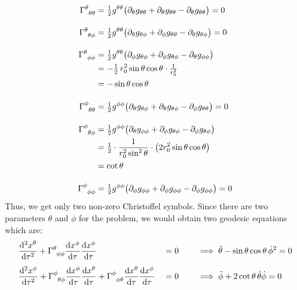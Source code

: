 \begin{align*}
\chris{\theta}{\theta}{\theta} 
&= \tfrac{1}{2} g^{\theta\theta} \big( 
    \partial_\theta g_{\theta\theta} 
  + \partial_\theta g_{\theta\theta} 
  - \partial_\theta g_{\theta\theta} 
\big) = 0 \\[1em]
\chris{\theta}{\theta}{\phi} 
&= \tfrac{1}{2} g^{\theta\theta} \big( 
    \partial_\theta g_{\theta\phi} 
  + \partial_\phi g_{\theta\theta} 
  - \partial_\theta g_{\theta\phi} 
\big) = 0 \\[1em]
\chris{\theta}{\phi}{\phi} 
&= \tfrac{1}{2} g^{\theta\theta} \big( 
    \partial_\phi g_{\theta\phi} 
  + \partial_\phi g_{\theta\phi} 
  - \partial_\theta g_{\phi\phi} 
\big) \\
&= -\tfrac{1}{2}\, r_0^2 \sin\theta \cos\theta \cdot \tfrac{1}{r_0^2} \\
&= -\sin\theta \cos\theta \\[1em]
\chris{\phi}{\theta}{\theta} 
&= \tfrac{1}{2} g^{\phi\phi} \big( 
    \partial_\theta g_{\theta\phi} 
  + \partial_\theta g_{\theta\phi} 
  - \partial_\phi g_{\theta\theta} 
\big) = 0 \\[1em]
\chris{\phi}{\theta}{\phi} 
&= \tfrac{1}{2} g^{\phi\phi} \big( 
    \partial_\theta g_{\phi\phi} 
  + \partial_\phi g_{\theta\phi} 
  - \partial_\phi g_{\theta\phi} 
\big) \\
&= \tfrac{1}{2} \cdot \frac{1}{r_0^2 \sin^2\theta} \cdot 
    \big(2 r_0^2 \sin\theta \cos\theta\big) \\
&= \cot\theta \\[1em]
\chris{\phi}{\phi}{\phi} 
&= \tfrac{1}{2} g^{\phi\phi} \big( 
    \partial_\phi g_{\phi\phi} 
  + \partial_\phi g_{\phi\phi} 
  - \partial_\phi g_{\phi\phi} 
\big)=  0
\end{align*}
Thus, we get only two non-zero Christoffel symbols. Since there are two parameters $\theta$ and $\phi$ for the problem, we would obtain two geodesic equations which are:
\begin{alignat}{3}
    &\dv[2]{x^\theta}{\tau} 
      + \chris{\theta}{\phi}{\phi}\dv{x^{\phi}}{\tau}\dv{x^{\phi}}{\tau} 
      &&= 0
      &\quad&\implies \ddot{\theta} - \sin\theta\cos\theta\,\dot{\phi}^2 = 0\label{eqn:gd1} \\[1ex]
    &\dv[2]{x^\phi}{\tau} 
      + \chris{\phi}{\theta}{\phi}\dv{x^{\phi}}{\tau}\dv{x^{\theta}}{\tau}
      + \chris{\phi}{\phi}{\theta}\dv{x^{\theta}}{\tau}\dv{x^{\phi}}{\tau} 
      &&= 0 
      &\quad&\implies \ddot{\phi} + 2\cot\theta\,\dot{\theta}\dot{\phi} = 0\label{eqn:gd2}
\end{alignat}
